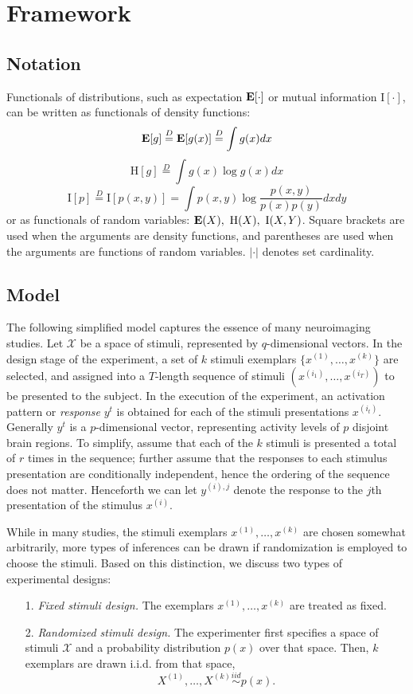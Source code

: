 \documentclass[12pt]{article}
\begin{document}
\section{Framework}

\subsection{Notation}

Functionals of distributions, such as expectation $\textbf{E}[\cdot]$ or mutual information $\text{I}[\cdot]$, can be written as functionals of density functions:
\[
\textbf{E}[g] \stackrel{D}{=} \textbf{E}[g(x)] \stackrel{D}{=} \int g(x) dx
\]
\[
\text{H}[g]  \stackrel{D}{=} \int g(x) \log g(x) dx
\]
\[
\text{I}[p]  \stackrel{D}{=} \text{I}[p(x,y)] = \int p(x, y) \log \frac{p(x,y)}{p(x) p(y)} dx dy
\]
or as functionals of random variables:
$\textbf{E}(X), \ \text{H}(X), \ \text{I}(X, Y)$.  Square brackets are used
when the arguments are density functions, and parentheses are used
when the arguments are functions of random variables.  $|\cdot|$
denotes set cardinality.

\subsection{Model}

The following simplified model captures the essence of many
neuroimaging studies.  Let $\mathcal{X}$ be a space of stimuli,
represented by $q$-dimensional vectors.  In the design stage of the
experiment, a set of $k$ stimuli exemplars $\{x^{(1)},\hdots, x^{(k)}\}$ are
selected, and assigned into a $T$-length sequence of stimuli $(
x^{(i_1)},\hdots, x^{(i_T)} )$ to be presented to the subject.  In the
execution of the experiment, an activation pattern or \emph{response}
$y^{t}$ is obtained for each of the stimuli presentations $x^{(i_t)}$.
Generally $y^t$ is a $p$-dimensional vector, representing activity
levels of $p$ disjoint brain regions.  To simplify, assume that each
of the $k$ stimuli is presented a total of $r$ times in the sequence;
further assume that the responses to each stimulus presentation are
conditionally independent, hence the ordering of the sequence does not
matter.  Henceforth we can let $y^{(i),j}$ denote the response to the
$j$th presentation of the stimulus $x^{(i)}$.

While in many studies, the stimuli exemplars $x^{(1)},\hdots,x^{(k)}$
are chosen somewhat arbitrarily, more types of inferences can be drawn
if randomization is employed to choose the stimuli.
Based on this distinction, we discuss two types of experimental designs:
\begin{itemize}
\item[1.] \emph{Fixed stimuli design.}
The exemplars $x^{(1)},\hdots, x^{(k)}$ are treated as fixed.
\item[2.] \emph{Randomized stimuli design.}
The experimenter first specifies a space of stimuli $\mathcal{X}$
and a probability distribution $p(x)$ over that space.
Then, $k$ exemplars are drawn i.i.d. from that space,
\[
X^{(1)},\hdots, X^{(k)} \stackrel{iid}{\sim} p(x).
\]
\end{itemize}
\end{document}
